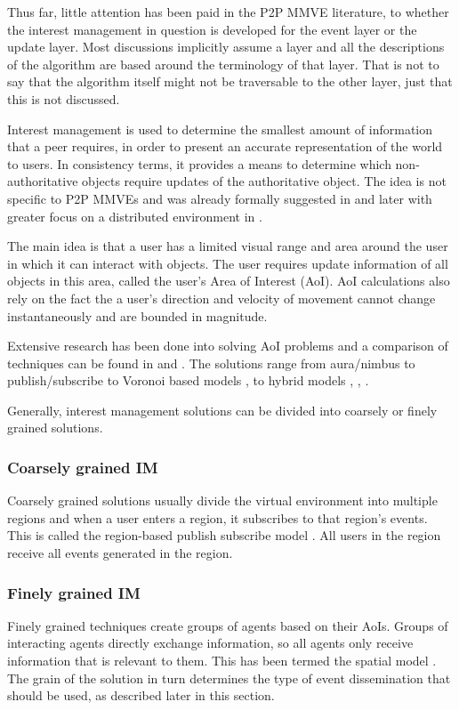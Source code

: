 Thus far, little attention has been paid in the P2P MMVE literature, to whether the interest management in question is developed for the event layer or the update layer. Most discussions implicitly assume a layer and all the descriptions of the algorithm are based around the terminology of that layer. That is not to say that the algorithm itself might not be traversable to the other layer, just that this is not discussed.

Interest management is used to determine the smallest amount of information that a peer requires, in order to present an accurate representation of the world to users. In consistency terms, it provides a means to determine which non-authoritative objects require updates of the authoritative object. The idea is not specific to P2P MMVEs and was already formally suggested in \cite{First_IM} and later with greater focus on a distributed environment in \cite{Whang_agent_based_IM}.

The main idea is that a user has a limited visual range and area around the user in which it can interact with objects. The user requires update information of all objects in this area, called the user's Area of Interest (AoI). AoI calculations also rely on the fact the a user's direction and velocity of movement cannot change instantaneously and are bounded in magnitude.

Extensive research has been done into solving AoI problems and a comparison of techniques can be found in \cite{Boulanger_IM_compare} and \cite{IM_and_ED_survey_Krause}. The solutions range from aura/nimbus \cite{Benford_spatial_IM} to publish/subscribe  \cite{mercury_publish_subscribe} to Voronoi based models \cite{Hu_voronoi_IM},  \cite{Buyukkaya_voronoi_state_management} to hybrid models \cite{hybrid_IM}, \cite{MOPAR}, \cite{fan_mediator_paper}.

Generally, interest management solutions can be divided into coarsely or finely grained solutions.

\subsubsection{Coarsely grained IM}
Coarsely grained solutions usually divide the virtual environment into multiple regions and when a user enters a region, it subscribes to that region's events. This is called the region-based publish subscribe model \cite{Fan_deisgn_issues_p2p}. All users in the region receive all events generated in the region.

\subsubsection{Finely grained IM}
Finely grained techniques create groups of agents based on their AoIs. Groups of interacting agents directly exchange information, so all agents only receive information that is relevant to them. This has been termed the spatial model \cite{Fan_deisgn_issues_p2p}. The grain of the solution in turn determines the type of event dissemination that should be used, as described later in this section.

